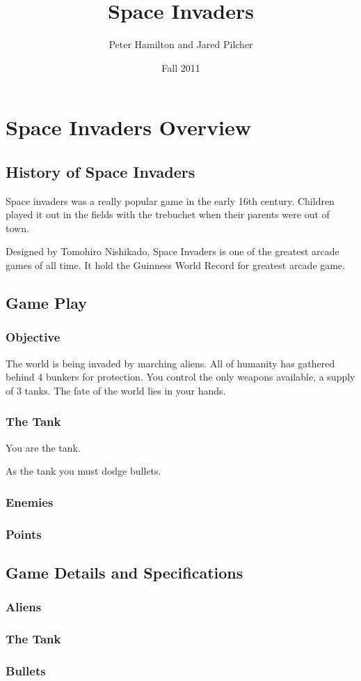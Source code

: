 \documentclass[11pt,letter,oneside]{report}
\begin{document}
\title{Space Invaders}
\author{Peter Hamilton and Jared Pilcher}
\date{Fall 2011}
\maketitle

\tableofcontents

\chapter{Space Invaders Overview}
\section{History of Space Invaders}

Space invaders was a really popular game in the early 16th century.  Children played it out in the fields with the trebuchet when their parents were out of town.

Designed by Tomohiro Nishikado, Space Invaders is one of the greatest arcade games of all time.  It hold the Guinness World Record for greatest arcade game.
 

\section{Game Play}

\subsection{Objective}

The world is being invaded by marching aliens.  All of humanity has gathered behind 4 bunkers for protection.  You control the only weapons available, a supply of 3 tanks.  The fate of the world lies in your hands.

\subsection{The Tank}

You are the tank.

As the tank you must dodge bullets.

\subsection{Enemies}

\subsection{Points}

\section{Game Details and Specifications}

\subsection{Aliens}

\subsection{The Tank}

\subsection{Bullets}
\end{document}
